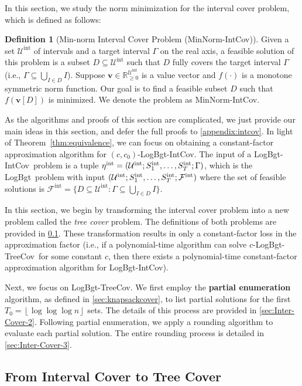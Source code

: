\documentclass[11pt,a4paper]{article} \usepackage{enumitem}
\newcommand{\floor}[1]{\left\lfloor #1 \right\rfloor}
\newcommand{\assigned}[1]{[ #1 ]}
\newcommand{\calF}{\mathcal{F}}
\newcommand{\calU}{\mathcal{U}}
\newcommand{\boldv}{\boldsymbol{v}}
\newcommand{\LBO}{\textsf{LogBgt}}
\newcommand{\minnormintcov}{\textsf{MinNorm-IntCov}}
\newcommand{\LBOintcov}{\textsf{LogBgt-IntCov}}
\newcommand{\LBOtreecov}{\textsf{LogBgt-TreeCov}}
\newcommand{\intU}{\operatorname{\calU^{int}}}
\newcommand{\intS}[1]{\ifx\relax#1\relax
    S^{\operatorname{int}} \else
    S^{\operatorname{int}}_{#1} \fi
}
\newcommand{\intF}{\operatorname{\calF^{int}}}
\newcommand{\inteta}{\operatorname{\eta^{int}}}
\theoremstyle{definition}
\newtheorem{definition}{Definition}[section]
\begin{document}
In this section, we study the norm minimization for the interval cover problem, which is defined as follows:

\begin{definition}[Min-norm Interval Cover Problem (\minnormintcov)]
Given a set $\intU$ of intervals and a target interval $\Gamma$ on the real axis, a feasible solution of this problem is a subset $D \subseteq \intU$ such that $D$ fully covers the target interval $\Gamma$ (i.e., $\Gamma \subseteq \bigcup_{I \in D} I$).
Suppose $\boldv\in \mathbb{R}_{\ge 0}^{\intU}$ is a value vector and
$f(\cdot)$ is a monotone symmetric norm function. 
Our goal is to find a feasible subset $D$ such that $f(\boldv\assigned{D})$ is minimized.
We denote the problem as \minnormintcov.
\end{definition}

As the algorithms and proofs of this section are complicated, we just provide our main ideas in this section, and defer the full proofs to \cref{appendix:intcov}.
In light of Theorem~\ref{thm:equivalence},
we can focus on obtaining a constant-factor approximation algorithm for $(c,c_0)$-\LBOintcov. 
The input of a \LBOintcov\ problem is a tuple $\inteta=(\intU;\intS{1},\ldots,\intS{T};\Gamma)$, which is the \LBO\ problem with input $(\intU;\intS{1},\ldots,\intS{T};\intF)$
where the set of feasible solutions is $\intF=\lbrace D\subseteq \intU : \Gamma\subseteq \bigcup_{I\in D} I\rbrace$. 

In this section, we begin by transforming the interval cover problem into a new problem called the {\em tree cover} problem. The definitions of both problems are provided in \cref{sec:Inter-Cover-1}. 
These transformation results in only a constant-factor loss in the approximation factor
(i.e., if a polynomial-time algorithm can solve $c$-\LBOtreecov\ for some constant $c$, then there exists a polynomial-time constant-factor approximation algorithm for \LBOintcov).

Next, we focus on \LBOtreecov. 
We first employ the \textbf{partial enumeration} algorithm, as defined in \cref{sec:knapsackcover}, to list partial solutions for the first $T_0 = \floor{\log\log\log n}$ sets. 
The details of this process are provided in \cref{sec:Inter-Cover-2}. Following partial enumeration, we apply a rounding algorithm to evaluate each partial solution. The entire  rounding process is detailed in \cref{sec:Inter-Cover-3}.

\subsection{From Interval Cover to Tree Cover}
\label{sec:Inter-Cover-1}
\end{document}
